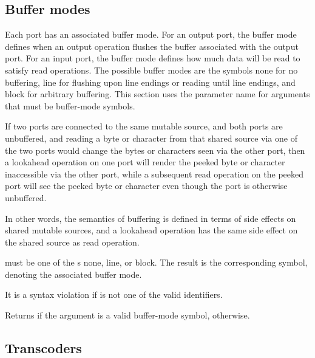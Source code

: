 \subsection{Buffer modes}

Each port has an associated buffer mode.  For an output port, the
buffer mode defines when an output operation flushes the buffer
associated with the output port.  For an input port, the buffer mode
defines how much data will be read to satisfy read operations.  The
possible buffer modes are the symbols {\cf none} for no buffering,
{\cf line} for flushing upon line endings or reading until line
endings, and {\cf block} for arbitrary buffering.  This section uses
the parameter name  for arguments that must be
buffer-mode symbols.

If two ports are connected to the same mutable source, and both ports
are unbuffered, and reading a byte or character from that shared
source via one of the two ports would change the bytes or characters
seen via the other port, then a lookahead operation on one port will
render the peeked byte or character inaccessible via the other port,
while a subsequent read operation on the peeked port will see the
peeked byte or character even though the port is otherwise unbuffered.

In other words, the semantics of buffering is defined in terms of side
effects on shared mutable sources, and a lookahead operation has the
same side effect on the shared source as read operation.

\begin{entry}{%
}
   
 must be one of the s {\cf none}, {\cf line}, or
{\cf block}. The result is the corresponding symbol, denoting the
associated buffer mode.

It is a syntax violation if  is not one of the valid
identifiers.
\end{entry}

\begin{entry}{%
}
   
Returns \schtrue{} if the argument is a valid buffer-mode symbol,
\schfalse{} otherwise.
\end{entry}

\subsection{Transcoders}
\label{transcoderssection}

